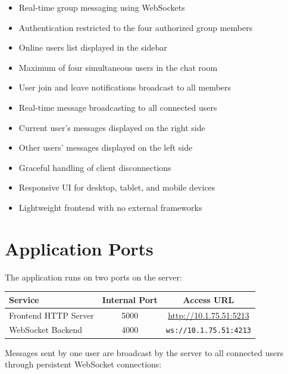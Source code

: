 \documentclass[11pt,a4paper]{article}
\begin{document}
\begin{itemize}[leftmargin=*, itemsep=3pt]
    \item Real-time group messaging using WebSockets
    \item Authentication restricted to the four authorized group members
    \item Online users list displayed in the sidebar
    \item Maximum of four simultaneous users in the chat room
    \item User join and leave notifications broadcast to all members
    \item Real-time message broadcasting to all connected users
    \item Current user's messages displayed on the right side
    \item Other users' messages displayed on the left side
    \item Graceful handling of client disconnections
    \item Responsive UI for desktop, tablet, and mobile devices
    \item Lightweight frontend with no external frameworks
\end{itemize}


\section{Application Ports}

The application runs on two ports on the server:

\begin{center}
\begin{tabular}{lcc}
    \toprule
    \textbf{Service} & \textbf{Internal Port} & \textbf{Access URL} \\
    \midrule
    Frontend HTTP Server & 5000 & \url{http://10.1.75.51:5213} \\
    WebSocket Backend    & 4000 & \texttt{ws://10.1.75.51:4213} \\
    \bottomrule
\end{tabular}
\end{center}

\vspace{0.4cm}

Messages sent by one user are broadcast by the server to all connected users through persistent WebSocket connections:
\end{document}
